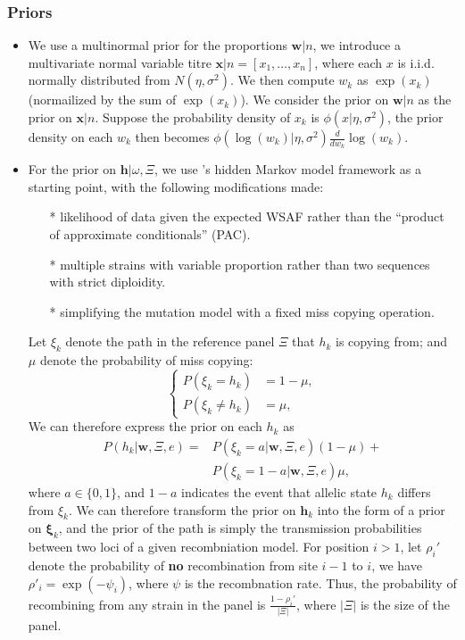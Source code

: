 \documentclass{bioinfo}
\begin{document}
\subsubsection{Priors}
\begin{itemize}
\item We use a multinormal prior for the proportions $\mathbf{w}|n$, we introduce a multivariate normal variable titre ${\mathbf x}|n = [x_1,\dots,x_n]$, where each $x$ is i.i.d. normally distributed from $N(\eta, \sigma^2)$. We then compute $w_k$ as $\exp(x_k)$ (normailized by the sum of $\exp(x_k)$). We consider the prior on $\mathbf{w}|n$ as the prior on $\mathbf{x}|n$. Suppose the probability density of $x_k$ is $\phi(x|\eta, \sigma^2)$, the prior density on each $w_k$ then becomes $\phi(\log(w_k)|\eta, \sigma^2)\frac{d}{dw_k}\log(w_k)$.


\item For the prior on $\mathbf{h} | \omega, \Xi$, we use \citet{Li2003}'s hidden Markov model framework as a starting point, with the following modifications made:
\begin{itemize}
\item[*] likelihood of data given the expected WSAF rather than the ``product of approximate conditionals'' (PAC).
\item[*] multiple strains with variable proportion rather than two sequences with strict diploidity.
\item[*] simplifying the mutation model with a fixed miss copying operation.
\end{itemize}

Let $\xi_k$ denote the path in the reference panel $\Xi$ that $h_k$ is copying from; and $\mu$ denote the probability of miss copying:
$$\begin{cases}
P(\xi_k = h_k) &= 1-\mu, \\
P(\xi_k \neq h_k) &= \mu,\end{cases}$$
We can therefore express the prior on each $h_k$ as
\begin{equation}
\begin{split}
P (h_k|\mathbf{w}, \Xi, e) = & P (\xi_k = a|\mathbf{w}, \Xi, e) (1-\mu) +\\
                             & P (\xi_k = 1-a|\mathbf{w}, \Xi, e) \mu,
\end{split}\label{eqn:prior_on_h}
\end{equation}
where $a \in \{0, 1\}$, and $1-a$ indicates the event that allelic state $h_k$ differs from $\xi_k$. We can therefore transform the prior on $\mathbf{h}_k$ into the form of a prior on $\mathbf{\xi}_k$, and the prior of the path is simply the transmission probabilities between two loci of a given recombniation model. For position $i > 1$, let $\rho_i'$ denote the probability of {\bf no} recombination from site $i-1$ to $i$, we have $\rho'_i = \exp(-\psi_i)$, where $\psi$ is the recombnation rate. Thus, the probability of recombining from any strain in the panel is $\displaystyle\frac{1-\rho_i'}{|\Xi|}$, where $|\Xi|$ is the size of the panel.

\end{itemize}
\end{document}
